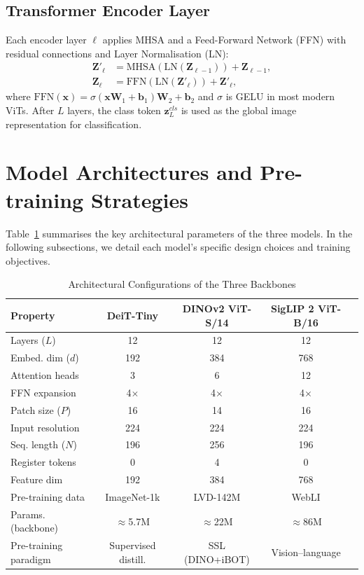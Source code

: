 \documentclass[journal]{IEEEtran}
\begin{document}
\subsection{Transformer Encoder Layer}
Each encoder layer $\ell$ applies MHSA and a Feed-Forward Network (FFN) with residual connections
and Layer Normalisation (LN):
\begin{align}
    \mathbf{Z}'_\ell &= \text{MHSA}(\text{LN}(\mathbf{Z}_{\ell-1})) + \mathbf{Z}_{\ell-1}, \\
    \mathbf{Z}_\ell  &= \text{FFN}(\text{LN}(\mathbf{Z}'_\ell)) + \mathbf{Z}'_\ell,
\end{align}
where $\text{FFN}(\mathbf{x}) = \sigma(\mathbf{x}\mathbf{W}_1 + \mathbf{b}_1)\mathbf{W}_2 + \mathbf{b}_2$
and $\sigma$ is GELU in most modern ViTs. After $L$ layers, the class token
$\mathbf{z}_L^{cls}$ is used as the global image representation for classification.

\section{Model Architectures and Pre-training Strategies}
\label{sec:architectures}

Table~\ref{tab:arch_summary} summarises the key architectural parameters of the three models.
In the following subsections, we detail each model's specific design choices and training objectives.

\begin{table}[!t]
\renewcommand{\arraystretch}{1.3}
\caption{Architectural Configurations of the Three Backbones}
\label{tab:arch_summary}
\centering
\begin{tabular}{lcccc}
\toprule
\textbf{Property} & \textbf{DeiT-Tiny} & \textbf{DINOv2 ViT-S/14} & \textbf{SigLIP 2 ViT-B/16} \\
\midrule
Layers ($L$)        & 12    & 12    & 12    \\
Embed. dim ($d$)    & 192   & 384   & 768   \\
Attention heads     & 3     & 6     & 12    \\
FFN expansion       & 4$\times$ & 4$\times$ & 4$\times$ \\
Patch size ($P$)    & 16    & 14    & 16    \\
Input resolution    & 224   & 224   & 224   \\
Seq. length ($N$)   & 196   & 256   & 196   \\
Register tokens     & 0     & 4     & 0     \\
Feature dim         & 192   & 384   & 768   \\
Pre-training data   & ImageNet-1k & LVD-142M & WebLI \\
Params. (backbone)  & $\approx$5.7M & $\approx$22M & $\approx$86M \\
Pre-training paradigm & Supervised distill. & SSL (DINO+iBOT) & Vision--language \\
\bottomrule
\end{tabular}
\end{table}
\end{document}

